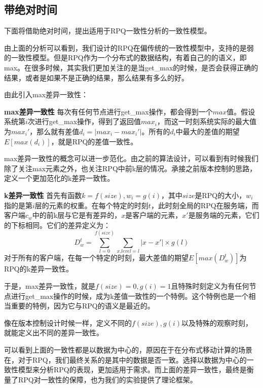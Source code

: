 	\subsection{带绝对时间}
		\par 下面将借助绝对时间，提出适用于RPQ一致性分析的一致性模型。
		\par 由上面的分析可以看到，我们设计的RPQ在偏传统的一致性模型中，支持的是弱的一致性模型。但是RPQ作为一个分布式的数据结构，有着自己的的语义，即max。在很多时候，其实我们更加关注的是当get\_max的时候，是否会获得正确的结果，或者是如果不是正确的结果，那么结果有多么的好。
		\par 由此引入max差异一致性：
		\begin{definition}
			\textbf{max差异一致性} 每次有任何节点进行get\_max操作，都会得到一个$max$值。假设系统第$i$次进行get\_max操作，得到了返回值$max_i$，而这一时刻系统实际的最大值为$max_i'$，那么就有差值$d_i=|max_i-max_i'|$。所有的$d_i$中最大的差值的期望$E\left[ max(d_i)\right] $，就是RPQ的差值一致性。
		\end{definition}
		\par max差异一致性的概念可以进一步范化。由之前的算法设计，可以看到有时候我们除了关注max元素之外，也关注RPQ中前k层的情况。承接之前版本控制的思路，定义一个更加范化的k差异一致性。
		\begin{definition}
			\textbf{k差异一致性} 首先有函数$k=f(size),w_i=g(i)$，其中$size$是RPQ的大小，$w_i$指的是第$i$层的元素的权重。在每个特定的时刻$t$，此时刻全局的RPQ在服务端，而客户端$c_w$中的前k层与它是有差异的，$x$是客户端的元素，$x'$是服务端的元素，它们的下标相同。它们的差异定义为：$$D_w^t=\sum_{l=0}^{f(size)}\sum_{x.level=l}|x-x'|\times g(l)$$对于所有的客户端，在每一个特定的时刻，最大差值的期望$E[max(D_w^t)]$为RPQ的k差异一致性。
		\end{definition}
		\par 于是，max差异一致性，就是$f(size)=0, g(i)=1$且特殊时刻定义为有任何节点进行get\_max操作的时候，成为k差值一致性的一个特例。这个特例也是一个相当重要的特例，因为它与RPQ的语义是最近的。
		\par 像在版本控制设计时候一样，定义不同的$f(size), g(i)$以及特殊的观察时刻，就能定义出不同的差异一致性。
		\par 可以看到上面的一致性都是以数据为中心的，原因在于在分布式移动计算的场景在，对于RPQ，我们最终关系的是其中的数据是否一致。选择以数据为中心的一致性模型来分析RPQ的表现，更加适用于需求。而上面的差异一致性，最终是衡量了RPQ对一致性的保障，也为我们的实验提供了理论框架。